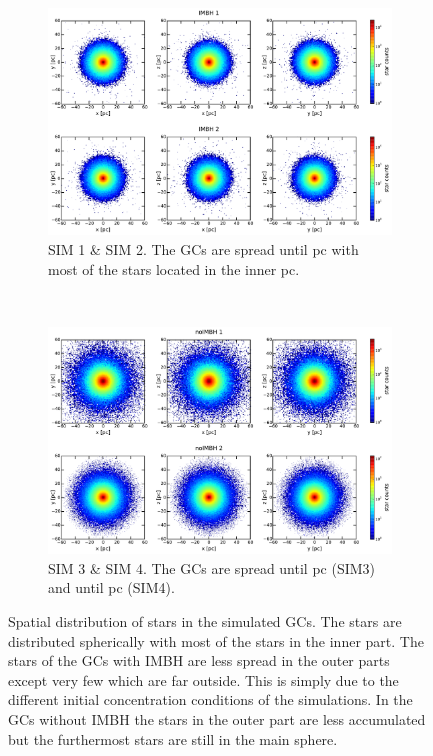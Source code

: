 \begin{figure}[htbp] 
\centering
\begin{subfigure}{0.8\textwidth}
	\centering
  	\includegraphics[width=\textwidth]{Plots/position_scatter_plot_IMBH.pdf}
  	\caption{SIM 1 \& SIM 2. The \acp{GC} are spread until \unit[100]{pc} with most of the stars located in the inner \unit[40]{pc}.}
 	\label{fig:pos_scat_IMBH}
\end{subfigure}
\\
\begin{subfigure}{0.8\textwidth}
	\centering
  	\includegraphics[width=\textwidth]{Plots/position_scatter_plot_noIMBH.pdf}
  	\caption{SIM 3 \& SIM 4. The \acp{GC} are spread until \unit[90]{pc} (SIM3) and until \unit[60]{pc} (SIM4).}
 	\label{fig:pos_scat_noIMBH}
\end{subfigure}

\caption{Spatial distribution of stars in the simulated \acp{GC}. The stars are distributed spherically with most of the stars in the inner part. The stars of the \acp{GC} with \ac{IMBH} are less spread in the outer parts except very few which are far outside. This is simply due to the different initial concentration conditions of the simulations. In the \acp{GC} without \ac{IMBH} the stars in the outer part are less accumulated but the furthermost stars are still in the main sphere.}
\label{fig:position_scatter}
\end{figure}

